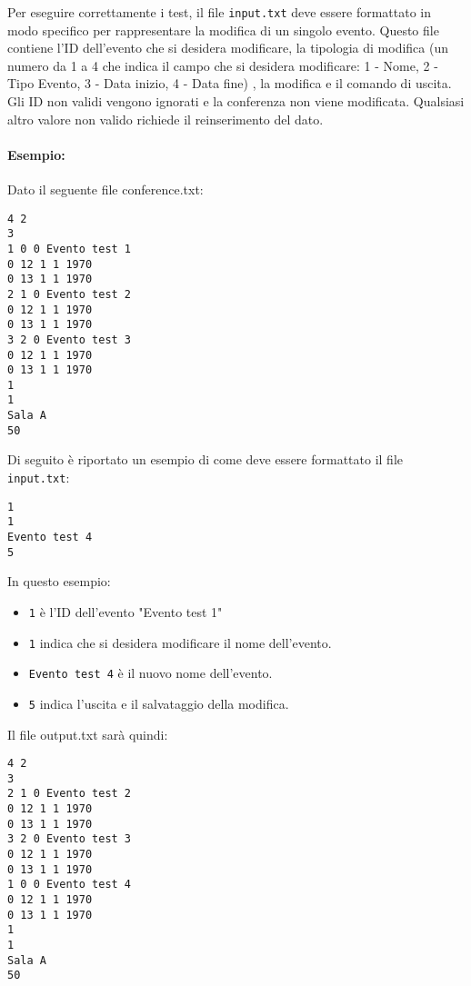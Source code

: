 \documentclass[11pt]{scrartcl} %
\begin{document}
Per eseguire correttamente i test, il file \texttt{input.txt} deve essere formattato in modo specifico per rappresentare la modifica di un singolo evento. Questo file contiene l'ID dell'evento che si desidera modificare, la tipologia di modifica (un numero da 1 a 4 che indica il campo che si desidera modificare: 1 - Nome, 2 - Tipo Evento, 3 - Data inizio, 4 - Data fine) , la modifica e il comando di uscita.
Gli ID non validi vengono ignorati e la conferenza non viene modificata.
Qualsiasi altro valore non valido richiede il reinserimento del dato.



\paragraph{Esempio:}
Dato il seguente file conference.txt:
\begin{lstlisting}
4 2
3
1 0 0 Evento test 1
0 12 1 1 1970
0 13 1 1 1970
2 1 0 Evento test 2
0 12 1 1 1970
0 13 1 1 1970
3 2 0 Evento test 3
0 12 1 1 1970
0 13 1 1 1970
1
1
Sala A
50
\end{lstlisting}

Di seguito è riportato un esempio di come deve essere formattato il file \texttt{input.txt}:

\begin{lstlisting}
1
1
Evento test 4
5
\end{lstlisting}

In questo esempio:
\begin{itemize}
    \item \texttt{1} è l'ID dell'evento "Evento test 1"
    \item \texttt{1} indica che si desidera modificare il nome dell'evento.
    \item \texttt{Evento test 4} è il nuovo nome dell'evento.
    \item \texttt{5} indica l'uscita e il salvataggio della modifica.
\end{itemize}
Il file output.txt sarà quindi:

\begin{lstlisting}
4 2
3
2 1 0 Evento test 2
0 12 1 1 1970
0 13 1 1 1970
3 2 0 Evento test 3
0 12 1 1 1970
0 13 1 1 1970
1 0 0 Evento test 4
0 12 1 1 1970
0 13 1 1 1970
1
1
Sala A
50
\end{lstlisting}
\end{document}
